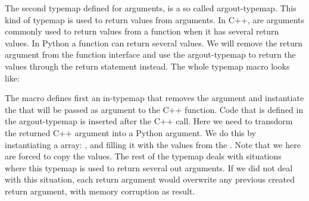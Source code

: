 The second typemap defined for  arguments, is a so called argout-typemap. This kind of typemap is used to return values from arguments. In C++, are arguments commonly used to return values from a function when it has several return values. In Python a function can return several values. We will remove the return argument from the function interface and use the argout-typemap to return the values through the return statement instead. The whole typemap macro looks like:
The macro defines first an in-typemap that removes the argument and instantiate the  that will be passed as argument to the C++ function. Code that is defined in the argout-typemap is inserted after the C++ call. Here we need to transdorm the returned C++ argument into a Python argument. We do this by instantiating a \numpy array: , and filling it with the values from the . Note that we here are forced to copy the values. The rest of the typemap deals with situations where this typemap is used to return several out arguments. If we did not deal with this situation, each return argument would overwrite any previous created return argument, with memory corruption as result.\par

